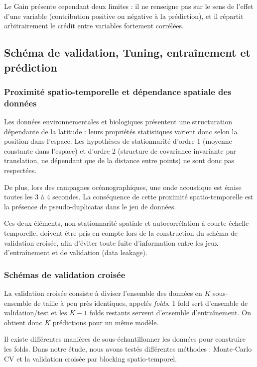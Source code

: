 \documentclass[11pt,a4paper,oneside]{report}
\begin{document}
	Le Gain présente cependant deux limites : il ne renseigne pas sur le sens de l'effet d'une variable (contribution positive ou négative à la prédiction), et il répartit arbitrairement le crédit entre variables fortement corrélées.
	
	\subsection{Schéma de validation, Tuning, entraînement et prédiction}
	
	\subsubsection{Proximité spatio-temporelle et dépendance spatiale des données}
	Les données environnementales et biologiques présentent une structuration dépendante de la latitude : leurs propriétés statistiques varient donc selon la position dans l'espace. Les hypothèses de stationnarité d'ordre 1 (moyenne constante dans l'espace) et d'ordre 2 (structure de covariance invariante par translation, ne dépendant que de la distance entre points) ne sont donc pas respectées.
	
	De plus, lors des campagnes océanographiques, une onde acoustique est émise toutes les 3 à 4 secondes. La conséquence de cette proximité spatio-temporelle est la présence de pseudo-duplicatas dans le jeu de données. 
	
	Ces deux éléments, non-stationnarité spatiale et autocorrélation à courte échelle temporelle, doivent être pris en compte lors de la construction du schéma de validation croisée, afin d'éviter toute fuite d'information entre les jeux d'entraînement et de validation (data leakage).
	
	\subsubsection{Schémas de validation croisée}
	La validation croisée consiste à diviser l'ensemble des données en $K$ sous-ensemble de taille à peu près identiques, appelés \textit{folds}. 1 fold sert d'ensemble de validation/test et les $K-1$ folds restants servent d'ensemble d'entraînement. On obtient donc $K$ prédictions pour un même modèle. 
	
	Il existe différentes manières de sous-échantillonner les données pour construire les folds. Dans notre étude, nous avons testés différentes méthodes : Monte-Carlo CV et la validation croisée par blocking spatio-temporel.
	
\end{document}
